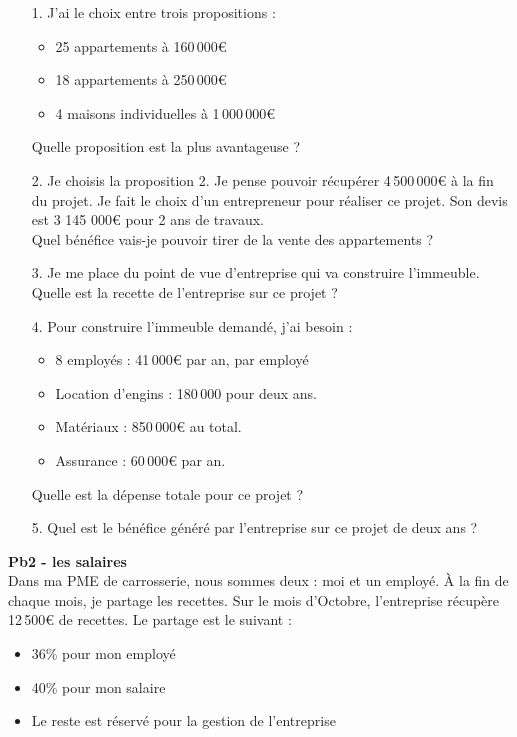 \begin{enumerate}
  \item[1.] J'ai le choix entre trois propositions : 

    \begin{itemize}[label={$\bullet$}]
        \item 25 appartements à 160\,000€
        \item 18 appartements à 250\,000€
        \item 4 maisons individuelles à 1\,000\,000€
    \end{itemize}
    Quelle proposition est la plus avantageuse ?
  
  \item[2.] Je choisis la proposition 2. Je pense pouvoir récupérer 4\,500\,000€ à la fin du projet. \newline
    Je fait le choix d'un entrepreneur pour réaliser ce projet. Son devis est 3 145 000€ pour 2 ans de travaux. \\
  Quel bénéfice vais-je pouvoir tirer de la vente des appartements ?

  \item[3.] Je me place du point de vue d'entreprise qui va construire l'immeuble. \\
    Quelle est la recette de l'entreprise sur ce projet ?

  \item[4.] Pour construire l'immeuble demandé, j'ai besoin :
    \begin{itemize}[label={$\bullet$}]
      \item 8 employés : 41\,000€ par an, par employé
      \item Location d'engins : 180\,000 pour deux ans.
      \item Matériaux : 850\,000€ au total.
      \item Assurance : 60\,000€ par an.
    \end{itemize}
  Quelle est la dépense totale pour ce projet ?

  \item[5.] Quel est le bénéfice généré par l'entreprise sur ce projet de deux ans ? \\

\end{enumerate}

\textbf{Pb2 - les salaires}\\

Dans ma PME de carrosserie, nous sommes deux : moi et un employé. À la fin de chaque mois, je partage les recettes. Sur le mois d'Octobre, l'entreprise récupère 12\,500€ de recettes. \newline
Le partage est le suivant : 
\begin{itemize}[label={$\bullet$}]
  \item 36\% pour mon employé
  \item 40\% pour mon salaire
  \item Le reste est réservé pour la gestion de l'entreprise
\end{itemize}


